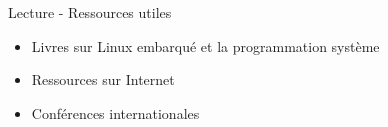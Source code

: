 \documentclass[a4paper,12pt,obeyspaces,spaces,hyphens]{article}
\begin{document}
\feagendaonecolumn
{Lecture - Ressources utiles}
{
  \begin{itemize}
  \item Livres sur Linux embarqué et la programmation système
  \item Ressources sur Internet
  \item Conférences internationales
  \end{itemize}
}
\end{document}
